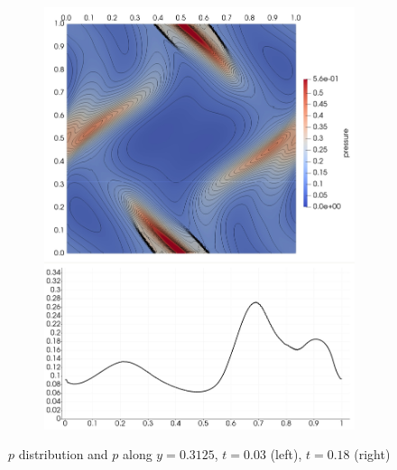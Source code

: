 \begin{figure}[H]
\begin{subfigure}[b]{0.425\textwidth}\includegraphics[width=\textwidth]{img/ot/my2.jpg}\end{subfigure}
\caption{$p$ distribution and $p$ along $y = 0.3125$, $t = 0.03$ (left), $t = 0.18$ (right)}
\label{figure:myOt1}
\end{figure}
\vspace{-8mm}
